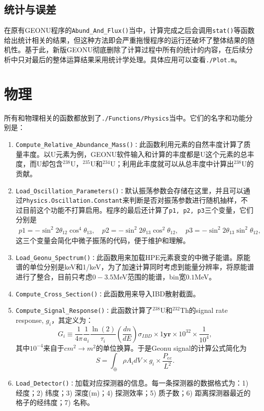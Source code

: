 			\subsection{统计与误差}
				在原有GEONU程序的\texttt{Abund\_And\_Flux()}当中，计算完成之后会调用\texttt{stat()}等函数给出统计相关的结果，但这种方法即会严重拖慢程序的运行还破坏了整体结果的随机性。基于此，新版GEONU彻底删除了计算过程中所有的统计的内容，在后续分析中只对最后的整体运算结果采用统计学处理。具体应用可以查看\texttt{./Plot.m}。
		\section{物理}
			所有和物理相关的函数都放到了\texttt{./Functions/Physics}当中。它们的名字和功能分别是：
				\begin{enumerate}
					\item \texttt{Compute\_Relative\_Abundance\_Mass()：}此函数利用元素的自然丰度计算了质量丰度。以U元素为例，GEONU软件输入和计算的丰度都是U这个元素的总丰度，而U却包含${}^{238}$U，${}^{235}$U和${}^{234}$U；利用此丰度就可以从总丰度中计算出${}^{238}$U的贡献。
					\item \texttt{Load\_Oscillation\_Parameters()：}默认振荡参数会存储在这里，并且可以通过\texttt{Physics.Oscillation.Constant}来判断是否对振荡参数进行随机抽样，不过目前这个功能不打算启用。程序的最后还计算了\texttt{p1, p2, p3}三个变量，它们分别是
						\begin{align}
							 p1 = -\sin^2 2\theta_{12} \cos^4 \theta_{13},
							 \quad
							 p2 = -\sin^2 2\theta_{13} \cos^2 \theta_{12},
							 \quad
							 p3 = - \sin^2 2\theta_{13} \sin^2 \theta_{12},
						\end{align}
					这三个变量会简化中微子振荡的代码，便于维护和理解。
					\item \texttt{Load\_Geonu\_Spectrum()：}此函数用来加载HPE元素衰变的中微子能谱。原能谱的单位分别是keV和1/keV，为了加速计算同时考虑到能量分辨率，将原能谱进行了整合，目前只考虑$0-3.5$MeV范围的能谱，bin宽$0.1$MeV。
					\item \texttt{Compute\_Cross\_Section()：}此函数用来导入IBD散射截面。
					\item \texttt{Compute\_Signal\_Response()：}此函数计算了${}^{238}$U和${}^{232}$Th的signal rate response, $g_i$，其定义为：
						\begin{equation}
							G_i
							\equiv \frac{1}{4\pi}\frac{1}{a_i} \frac{\ln(2)}{\tau_i} \left(\frac{dn}{dE}\right) \sigma_{IBD} \times 1 \textbf{yr} \times 10^{32} \times \frac{1}{10^4},
						\end{equation}
					其中$10^{-4}$来自于$cm^2\rightarrow m^2$的单位换算。于是Geonu signal的计算公式简化为
						\begin{equation}
							S
							= \int_{\oplus} \rho A_i dV \times g_i \times \frac{P_{ee}}{L^2}.
						\end{equation}
					\item \texttt{Load\_Detector()：}加载对应探测器的信息。每一条探测器的数据格式为：1) 经度；2) 纬度；3) 深度(m)；4) 探测效率；5) 质子数；6) 距离探测器最近的格子的经纬度；7) 名称。
				\end{enumerate}
